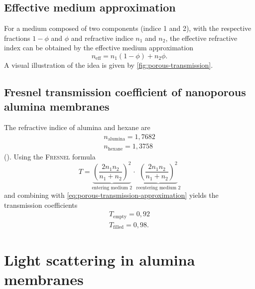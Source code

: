 \documentclass[../thesis.tex]{subfiles}
\begin{document}
      \subsection{Effective medium approximation}
      \label{subsec:effective-medium-approx}

        For a medium composed of two components (indice 1 and 2), with the respective fractions $1-\phi$ and $\phi$ and refractive indice $n_1$ and $n_2$, the effective refractive index can be obtained by the effective medium approximation
        \begin{equation}
          n_\mathrm{eff} = n_1 \left(1-\phi\right) + n_2 \phi.
          \label{eq:porous-transmission-approximation}
        \end{equation}
        A visual illustration of the idea is given by \cref{fig:porous-transmission}.

        


      \subsection{Fresnel transmission coefficient of nanoporous alumina membranes}

        The refractive indice of alumina and hexane are
        \begin{align*}
          n_\mathrm{alumina}=1,7682  \\%
          n_\mathrm{hexane}=1,3758  %
        \end{align*}
        (\cite{sapphire,hexane}). Using the \textsc{Fresnel} formula
        \begin{equation*}
          T=\underbrace{\left(\frac{2n_1n_2}{n_1+n_2}\right) ^2}_{\text{entering medium 2}}\cdot \underbrace{\left(\frac{2n_1n_2}{n_1+n_2}\right) ^2}_{\text{reentering medium 2}}
        \end{equation*}
        and combining with \cref{eq:porous-transmission-approximation} yields the transmission coefficients
        \begin{align}
          T_\mathrm{empty}=0,92 \\
          T_\mathrm{filled}=0,98  .
          \label{eq:trans-coeffs}
        \end{align}


      \section{Light scattering in alumina membranes}
      \label{sec:scattering-in-alumina-membranes}
\end{document}
